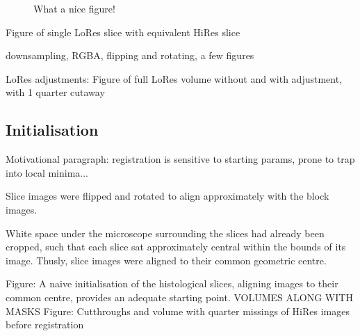 \begin{figure}
      \caption{What a nice figure!}
      \label{fig:LoRes_cross_sections}
    \end{figure}
    
    Figure of single LoRes slice with equivalent HiRes slice
    
    downsampling, RGBA, flipping and rotating, a few figures
    
    LoRes adjustments:
    Figure of full LoRes volume without and with adjustment, with 1 quarter cutaway
    
  
  \subsection{Initialisation} %
  \label{sub:initialisation}
    Motivational paragraph: registration is sensitive to starting params, prone to trap into local minima...
      
    Slice images were flipped and rotated to align approximately with the block images. 
    
    
    White space under the microscope surrounding the slices had already been cropped, such that each slice sat approximately central within the bounds of its image. Thusly, slice images were aligned to their common geometric centre.
    
    Figure: A naive initialisation of the histological slices, aligning images to their common centre, provides an adequate starting point. VOLUMES ALONG WITH MASKS
    Figure: Cutthroughs and volume with quarter missings of HiRes images before registration
    
